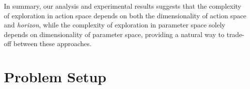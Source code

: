 In summary, our analysis and experimental results suggests that the
complexity of exploration in action space depends on both the
dimensionality of action space and \emph{horizon}, while the
complexity of exploration in parameter space solely depends on
dimensionality of parameter space, providing a natural way to trade-off
between these approaches.

%
%
%

%

%
%
%


%

%

%

\section{Problem Setup}
\label{sec:problem_define}


